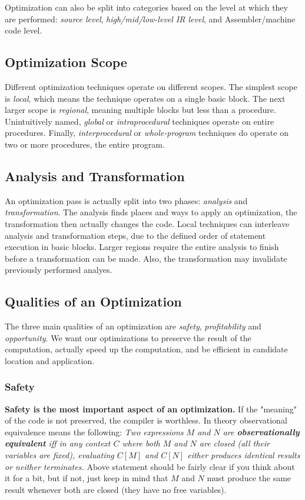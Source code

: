 \documentclass{article}
\begin{document}
Optimization can also be split into categories based on the level at which they are performed: \emph{source level}, \emph{high/mid/low-level IR level}, and Assembler/machine code level.

\subsection{Optimization Scope}
Different optimization techniques operate on different scopes.
The simplest scope is \emph{local}, which means the technique operates on a single basic block.
The next larger scope is \emph{regional}, meaning multiple blocks but less than a procedure.
Unintuitively named, \emph{global} or \emph{intraprocedural} techniques operate on entire procedures.
Finally, \emph{interprocedural} or \emph{whole-program} techniques do operate on two or more procedures, the entire program.

\subsection{Analysis and Transformation}
An optimization pass is actually split into two phases: \emph{analysis} and \emph{transformation}.
The analysis finds places and ways to apply an optimization, the transformation then actually changes the code.
Local techniques can interleave analysis and transformation steps, due to the defined order of statement execution in basic blocks.
Larger regions require the entire analysis to finish before a transformation can be made.
Also, the transformation may invalidate previously performed analyes.

\subsection{Qualities of an Optimization}
The three main qualities of an optimization are \emph{safety}, \emph{profitability} and \emph{opportunity}.
We want our optimizations to preserve the result of the computation, actually speed up the computation, and be efficient in candidate location and application.

\subsubsection{Safety}
\textbf{Safety is the most important aspect of an optimization.}
If the "meaning" of the code is not preserved, the compiler is worthless.
In theory observational equivalence means the following:
\emph{Two expressions $M$ and $N$ are \textbf{observationally equivalent} iff in any context $C$ where both $M$ and $N$ are closed (all their variables are fixed), evaluating $C\left[M\right]$ and $C\left[N\right]$ either produces identical results or neither terminates.}
Above statement should be fairly clear if you think about it for a bit, but if not, just keep in mind that $M$ and $N$ must produce the same result whenever both are closed (they have no free variables).
\end{document}
